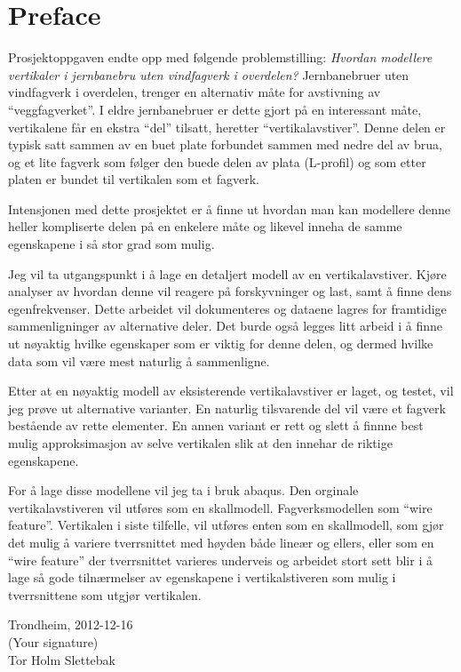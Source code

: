 \section*{Preface}

Prosjektoppgaven endte opp med følgende problemstilling: \emph{Hvordan modellere vertikaler i jernbanebru uten vindfagverk i overdelen?}
Jernbanebruer uten vindfagverk i overdelen, trenger en alternativ måte for avstivning av ``veggfagverket''. I eldre jernbanebruer er dette gjort på en interessant måte, vertikalene får en ekstra ``del'' tilsatt, heretter ``vertikalavstiver''. Denne delen er typisk satt sammen av en buet plate forbundet sammen med nedre del av brua, 
og et lite fagverk som følger den buede delen av plata (L-profil) og som etter platen er bundet til vertikalen som et fagverk. 

Intensjonen med dette prosjektet er å finne ut hvordan man kan modellere denne heller kompliserte delen på en enkelere måte og likevel inneha de samme egenskapene i så stor grad som mulig.

Jeg vil ta utgangspunkt i å lage en detaljert modell av en vertikalavstiver. Kjøre analyser av hvordan denne vil reagere på forskyvninger og last, samt å finne dens egenfrekvenser. Dette arbeidet vil dokumenteres og dataene lagres for framtidige sammenligninger av alternative deler. Det burde også legges litt arbeid i å finne ut nøyaktig hvilke egenskaper som er viktig for denne delen, og dermed hvilke data som vil være mest naturlig å sammenligne.

Etter at en nøyaktig modell av eksisterende vertikalavstiver er laget, og testet, vil jeg prøve ut alternative varianter. En naturlig tilsvarende del vil være et fagverk bestående av rette elementer. En annen variant er rett og slett å finnne best mulig approksimasjon av selve vertikalen slik at den innehar de riktige egenskapene. 

For å lage disse modellene vil jeg ta i bruk abaqus. Den orginale vertikalavstiveren vil utføres som en skallmodell. Fagverksmodellen som ``wire feature''. Vertikalen i siste tilfelle, vil utføres enten som en skallmodell, som gjør det mulig å variere tverrsnittet med høyden både lineær og ellers, eller som en ``wire feature'' der tverrsnittet varieres underveis og arbeidet stort sett blir i å lage så gode tilnærmelser av egenskapene i vertikalstiveren som mulig i tverrsnittene som utgjør vertikalen.

\begin{center}
Trondheim, 2012-12-16\\[1pc]
(Your signature)\\[1pc]
Tor Holm Slettebak
\end{center}